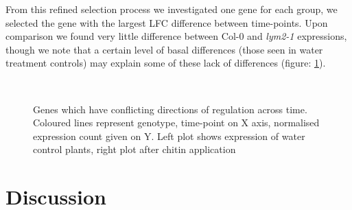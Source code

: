 \documentclass[../main.tex]{subfiles}
\begin{document}
From this refined selection process we investigated one gene for each group, we
selected the gene with the largest LFC difference between time-points. Upon
comparison we found very little difference between Col-0 and \textit{lym2-1}
expressions, though we note that a certain level of basal differences (those
seen in water treatment controls) may explain some of these lack of differences
(figure: \ref{fig:interestinggenes}).

\begin{figure}[!ht]
  \centering
  \\
  \caption[Genes which have conflicting directions of regulation across time]{Genes which have conflicting directions of regulation across time.
    Coloured lines represent genotype, time-point on X axis, normalised
    expression count given on Y. Left plot shows expression of water control
    plants, right plot after chitin application}
  \label{fig:interestinggenes}
\end{figure}


\section{Discussion}
\end{document}
